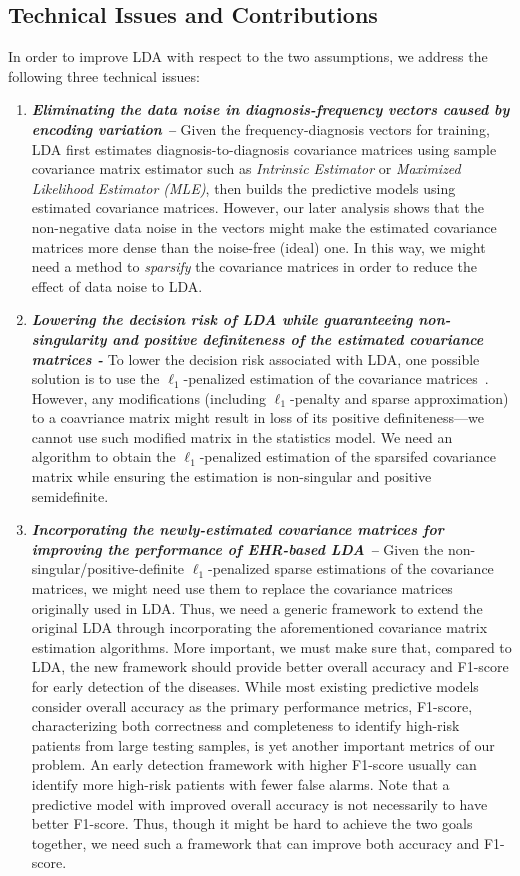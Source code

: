 \subsection{Technical Issues and Contributions} 
In order to improve LDA with respect to the two assumptions, we address the following three technical issues:
%
\begin{enumerate}
\item \textbf{\em Eliminating the data noise in diagnosis-frequency vectors caused by encoding variation -- } Given the frequency-diagnosis vectors for training, LDA first estimates diagnosis-to-diagnosis covariance matrices using sample covariance matrix estimator such as \emph{Intrinsic Estimator} or \emph{Maximized Likelihood Estimator (MLE)}, then builds the predictive models using estimated covariance matrices.
However, our later analysis shows that the non-negative data noise in the vectors might make the estimated covariance matrices more dense than the noise-free (ideal) one.
In this way, we might need a method to \emph{sparsify} the covariance matrices in order to reduce the effect of data noise to LDA.
 

\item \textbf{\em Lowering the decision risk of LDA while guaranteeing non-singularity and positive definiteness of the estimated covariance matrices - } To lower the decision risk associated with LDA, one possible solution is to use the $\ell_1$-penalized estimation of the covariance matrices~\cite{cai2012minimax,xue2012positive}.
However, any modifications (including $\ell_1$-penalty and sparse approximation) to a coavriance matrix might result in loss of its positive definiteness---we cannot use such modified matrix in the statistics model.
We need an algorithm to obtain the $\ell_1$-penalized estimation of the sparsifed covariance matrix while ensuring the estimation is non-singular and positive semidefinite.


\item \textbf{ \em Incorporating the newly-estimated covariance matrices for improving the performance of EHR-based LDA -- } Given the non-singular/positive-definite $\ell_1$-penalized sparse estimations of the  covariance matrices, we might need use them to replace the covariance matrices originally used in LDA.
Thus, we need a generic framework to extend the original LDA through incorporating the aforementioned covariance matrix estimation algorithms.
More important, we must make sure that, compared to LDA, the new framework should provide better overall accuracy and F1-score for early detection of the diseases.
While most existing predictive models consider overall accuracy as the primary performance metrics, F1-score, characterizing both correctness and completeness to identify high-risk patients from large testing samples, is yet another important metrics of our problem.
An early detection framework with higher F1-score usually can identify more high-risk patients with fewer false alarms.
Note that a predictive model with improved overall accuracy is not necessarily to have better F1-score.
Thus, though it might be hard to achieve the two goals together, we need such a framework that can improve both accuracy and F1-score.


\end{enumerate}
